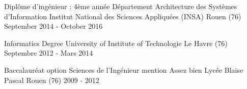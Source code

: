 

\begin{cventries}

  \cventryFour
    {Diplôme d'ingénieur : 4ème année Département Architecture des Systèmes d'Information} %
    {Institut National des Sciences Appliquées (INSA)} %
    {Rouen (76)} %
    {September 2014 - October 2016} %
    
    
  \cventryFour
	{Informatics Degree} %
	{University of Institute of Technologie} %
	{Le Havre (76)} %
	{Septembre 2012 - Mars 2014} %
	{}
	
  \cventryFour
	{Baccalauréat option Sciences de l'Ingénieur mention Assez bien} %
	{Lycée Blaise Pascal} %
	{Rouen (76)} %
	{2009 - 2012} %
	{}
	
	
\end{cventries}
